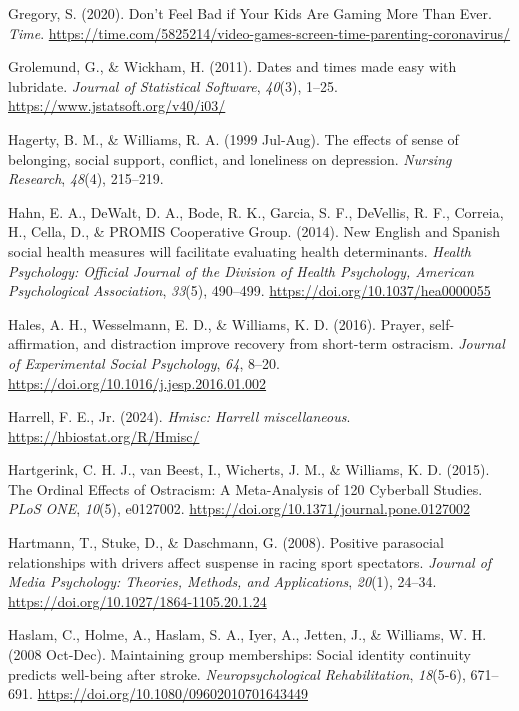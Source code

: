 \documentclass[
]{udthesis}
\newlength{\cslhangindent}
\newenvironment{CSLReferences}[2] %
 {\begin{list}{}{%
  \setlength{\itemindent}{0pt}
  \setlength{\leftmargin}{0pt}
  \setlength{\parsep}{0pt}
  \ifodd #1
   \setlength{\leftmargin}{\cslhangindent}
   \setlength{\itemindent}{-1\cslhangindent}
  \fi
  \setlength{\itemsep}{#2\baselineskip}}}
 {\end{list}}
\begin{document}
\begin{CSLReferences}{1}{0}
Gregory, S. (2020). Don{'}t Feel Bad if Your Kids Are Gaming More Than Ever. \emph{Time}. \url{https://time.com/5825214/video-games-screen-time-parenting-coronavirus/}

Grolemund, G., \& Wickham, H. (2011). Dates and times made easy with {lubridate}. \emph{Journal of Statistical Software}, \emph{40}(3), 1--25. \url{https://www.jstatsoft.org/v40/i03/}

Hagerty, B. M., \& Williams, R. A. (1999 Jul-Aug). The effects of sense of belonging, social support, conflict, and loneliness on depression. \emph{Nursing Research}, \emph{48}(4), 215--219.

Hahn, E. A., DeWalt, D. A., Bode, R. K., Garcia, S. F., DeVellis, R. F., Correia, H., Cella, D., \& PROMIS Cooperative Group. (2014). New {English} and {Spanish} social health measures will facilitate evaluating health determinants. \emph{Health Psychology: Official Journal of the Division of Health Psychology, American Psychological Association}, \emph{33}(5), 490--499. \url{https://doi.org/10.1037/hea0000055}

Hales, A. H., Wesselmann, E. D., \& Williams, K. D. (2016). Prayer, self-affirmation, and distraction improve recovery from short-term ostracism. \emph{Journal of Experimental Social Psychology}, \emph{64}, 8--20. \url{https://doi.org/10.1016/j.jesp.2016.01.002}

Harrell, F. E., Jr. (2024). \emph{Hmisc: Harrell miscellaneous}. \url{https://hbiostat.org/R/Hmisc/}

Hartgerink, C. H. J., van Beest, I., Wicherts, J. M., \& Williams, K. D. (2015). The {Ordinal Effects} of {Ostracism}: {A Meta}-{Analysis} of 120 {Cyberball Studies}. \emph{PLoS ONE}, \emph{10}(5), e0127002. \url{https://doi.org/10.1371/journal.pone.0127002}

Hartmann, T., Stuke, D., \& Daschmann, G. (2008). Positive parasocial relationships with drivers affect suspense in racing sport spectators. \emph{Journal of Media Psychology: Theories, Methods, and Applications}, \emph{20}(1), 24--34. \url{https://doi.org/10.1027/1864-1105.20.1.24}

Haslam, C., Holme, A., Haslam, S. A., Iyer, A., Jetten, J., \& Williams, W. H. (2008 Oct-Dec). Maintaining group memberships: Social identity continuity predicts well-being after stroke. \emph{Neuropsychological Rehabilitation}, \emph{18}(5-6), 671--691. \url{https://doi.org/10.1080/09602010701643449}


\end{CSLReferences}
\end{document}
